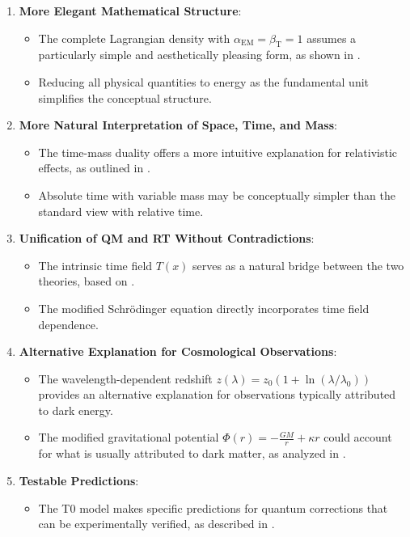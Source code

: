 \documentclass[12pt,a4paper]{article}
\newcommand{\Tfield}{T(x)}
\newcommand{\alphaEM}{\alpha_{\text{EM}}}
\newcommand{\betaT}{\beta_{\text{T}}}
\begin{document}
	\begin{enumerate}
		\item \textbf{More Elegant Mathematical Structure}:
		\begin{itemize}
			\item The complete Lagrangian density with $\alphaEM = \betaT = 1$ assumes a particularly simple and aesthetically pleasing form, as shown in \cite{pascher_formalismen_2025_en}.
			\item Reducing all physical quantities to energy as the fundamental unit simplifies the conceptual structure.
		\end{itemize}
		
		\item \textbf{More Natural Interpretation of Space, Time, and Mass}:
		\begin{itemize}
			\item The time-mass duality offers a more intuitive explanation for relativistic effects, as outlined in \cite{pascher_perspektive_2025_en}.
			\item Absolute time with variable mass may be conceptually simpler than the standard view with relative time.
		\end{itemize}
		
		\item \textbf{Unification of QM and RT Without Contradictions}:
		\begin{itemize}
			\item The intrinsic time field $\Tfield$ serves as a natural bridge between the two theories, based on \cite{pascher_erweiterung_2025_en}.
			\item The modified Schrödinger equation directly incorporates time field dependence.
		\end{itemize}
		
		\item \textbf{Alternative Explanation for Cosmological Observations}:
		\begin{itemize}
			\item The wavelength-dependent redshift $z(\lambda) = z_0(1 + \ln(\lambda/\lambda_0))$ provides an alternative explanation for observations typically attributed to dark energy.
			\item The modified gravitational potential $\Phi(r) = -\frac{GM}{r} + \kappa r$ could account for what is usually attributed to dark matter, as analyzed in \cite{pascher_galaxies_2025_en}.
		\end{itemize}
		
		\item \textbf{Testable Predictions}:
		\begin{itemize}
			\item The T0 model makes specific predictions for quantum corrections that can be experimentally verified, as described in \cite{pascher_params_2025_en}.
		\end{itemize}
	\end{enumerate}
	
\end{document}
